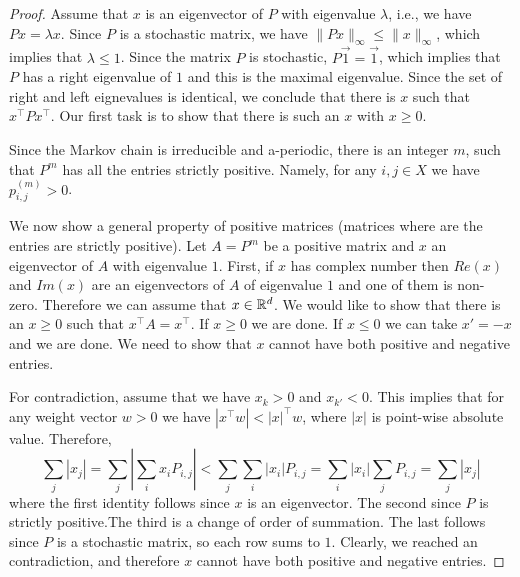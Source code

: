 \begin{proof}
Assume that $x$ is an eigenvector of $P$ with eigenvalue $\lambda$,
i.e., we have $Px=\lambda x$. Since $P$ is a stochastic matrix, we
have $\|P x\|_\infty \leq \|x\|_\infty$, which implies that $\lambda
\leq 1$. Since the matrix $P$ is stochastic, $P\vec{1}=\vec{1}$,
which implies that $P$ has a right eigenvalue of $1$ and this is the
maximal eigenvalue. Since the set of right and left eignevalues is
identical, we conclude that there is $x$ such that $x^\top Px^\top$.
Our first task is to show that there is such an $x$ with $x\geq0$.

Since the Markov chain is irreducible and a-periodic, there is an
integer $m$, such that $P^m$ has all the entries strictly positive.
Namely, for any $i,j\in X$ we have $p^{(m)}_{i,j}>0$.

We now show a general property of positive matrices (matrices where
are the entries are strictly positive). Let $A=P^m$ be a positive
matrix and $x$ an eigenvector of $A$ with eigenvalue $1$. First, if
$x$ has complex number then $Re(x)$ and $Im(x)$ are an eigenvectors
of $A$ of eigenvalue $1$ and one of them is non-zero. Therefore we
can assume that $x\in \mathbb{R}^d$. We would like to show that there is
an $x\geq 0$ such that $x^\top A=x^\top$. If $x\geq 0$ we are done.
If $x\leq 0$ we can take $x'=-x$ and we are done. We need to show
that $x$ cannot have both positive and negative entries.

For contradiction, assume that we have $x_{k}>0$ and $x_{k'}<0$.
This implies that for any weight vector $w>0$ we have $|x^\top w| <
|x|^\top w$, where $|x|$ is point-wise absolute value. Therefore,
\[
\sum_j |x_j|= \sum_j |\sum_i x_i P_{i,j}| < \sum_j \sum_i |x_i|
P_{i,j}=  \sum_i |x_i| \sum_j P_{i,j}= \sum_j |x_j|
\]
where the first identity follows since $x$ is an eigenvector. The
second since $P$ is strictly positive.The third is a change of order
of summation. The last follows since $P$ is a stochastic matrix, so
each row sums to $1$. Clearly, we reached an contradiction, and
therefore $x$ cannot have both positive and negative entries.

%
%


\end{proof}
